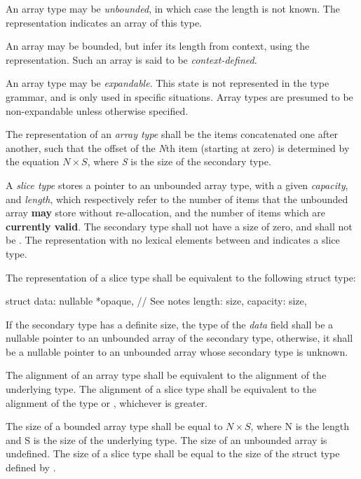 \specsubsubitem
An array type may be \textit{unbounded}, in which case the length is not known.
The \terminal{*} representation indicates an array of this type.

\specsubsubitem
An array may be bounded, but infer its length from context, using the
\terminal{\_} representation. Such an array is said to be
\textit{context-defined}.

\specsubsubitem
An array type may be \textit{expandable}. This state is not represented in the
type grammar, and is only used in specific situations. Array types are presumed
to be non-expandable unless otherwise specified.

\specsubsubitem
The representation of an \textit{array type} shall be the items concatenated one
after another, such that the offset of the \textit{N}th item (starting at zero)
is determined by the equation $N \times S$, where \textit{S} is the size of the
secondary type.

\specsubsubitem
A \textit{slice type} stores a pointer to an unbounded array type, with a given
\textit{capacity}, and \textit{length}, which respectively refer to the number
of items that the unbounded array \textbf{may} store without re-allocation, and
the number of items which are \textbf{currently valid}. The secondary type shall
not have a size of zero, and shall not be . The representation
with no lexical elements between \terminal{[} and \terminal{]} indicates a slice
type.

\specsubsubitem
The representation of a slice type shall be equivalent to the following struct
type:

\begin{codesample}
struct {
	data: nullable *opaque, // See notes
	length: size,
	capacity: size,
}
\end{codesample}

If the secondary type has a definite size, the type of the \textit{data} field
shall be a nullable pointer to an unbounded array of the secondary type,
otherwise, it shall be a nullable pointer to an unbounded array whose secondary
type is unknown.

\specsubsubitem
The alignment of an array type shall be equivalent to the alignment of the
underlying type. The alignment of a slice type shall be equivalent to the
alignment of the  type or , whichever is
greater.

\specsubsubitem
The size of a bounded array type shall be equal to $N \times S$, where N is the
length and S is the size of the underlying type. The size of an unbounded array
is undefined. The size of a slice type shall be equal to the size of the struct
type defined by .

